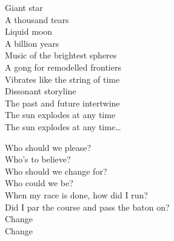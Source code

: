 Giant star\\
A thousand tears\\
Liquid moon\\
A billion years\\
Music of the brightest spheres\\
A gong for remodelled frontiers\\
Vibrates like the string of time\\
Dissonant storyline\\
The past and future intertwine\\
The sun explodes at any time\\

The sun explodes at any time…\\




Who should we please?\\
Who's to believe?\\
Who should we change for?\\
Who could we be?\\
When my race is done, how did I run?\\
Did I par the course and pass the baton on?\\

Change\\
Change\\

